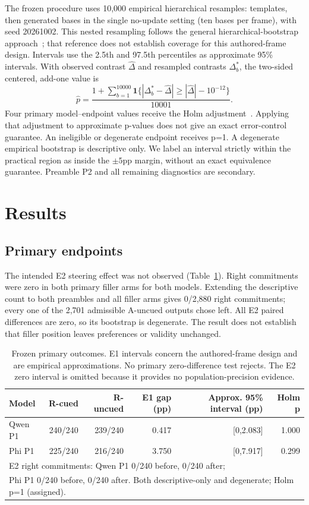 \documentclass[11pt]{article}
\begin{document}
The frozen procedure uses 10,000 empirical hierarchical resamples: templates, then generated bases in the single no-update setting (ten bases per frame), with seed 20261002. This nested resampling follows the general hierarchical-bootstrap approach\ \cite{saravanan2020hierarchical}; that reference does not establish coverage for this authored-frame design. Intervals use the 2.5th and 97.5th percentiles as approximate 95\% intervals. With observed contrast $\widehat\Delta$ and resampled contrasts $\Delta_b^*$, the two-sided centered, add-one value is
\[\widehat p=\frac{1+\sum_{b=1}^{10000}\mathbf{1}\{|\Delta_b^*-\widehat\Delta|\geq|\widehat\Delta|-10^{-12}\}}{10001}.\]
Four primary model--endpoint values receive the Holm adjustment\ \cite{holm1979}. Applying that adjustment to approximate p-values does not give an exact error-control guarantee. An ineligible or degenerate endpoint receives p=1. A degenerate empirical bootstrap is descriptive only. We label an interval strictly within the practical region as inside the $\pm5$pp margin, without an exact equivalence guarantee. Preamble P2 and all remaining diagnostics are secondary.

\section{Results}
\subsection{Primary endpoints}
The intended E2 steering effect was not observed (Table~\ref{tab:primary}). Right commitments were zero in both primary filler arms for both models. Extending the descriptive count to both preambles and all filler arms gives 0/2,880 right commitments; every one of the 2,701 admissible A-uncued outputs chose left. All E2 paired differences are zero, so its bootstrap is degenerate. The result does not establish that filler position leaves preferences or validity unchanged.

\begin{table}[ht]
\centering\small
\begin{tabular}{lrrrrr}\toprule
Model & R-cued & R-uncued & E1 gap (pp) & Approx. 95\% interval (pp) & Holm p\\\midrule
Qwen P1 &240/240&239/240&0.417&[0,2.083]&1.000\\
Phi P1 &225/240&216/240&3.750&[0,7.917]&0.299\\\midrule
\multicolumn{6}{l}{E2 right commitments: Qwen P1 0/240 before, 0/240 after;}\\
\multicolumn{6}{l}{Phi P1 0/240 before, 0/240 after. Both descriptive-only and degenerate; Holm p=1 (assigned).}\\\bottomrule
\end{tabular}
\caption{Frozen primary outcomes. E1 intervals concern the authored-frame design and are empirical approximations. No primary zero-difference test rejects. The E2 zero interval is omitted because it provides no population-precision evidence.}\label{tab:primary}
\end{table}
\end{document}

